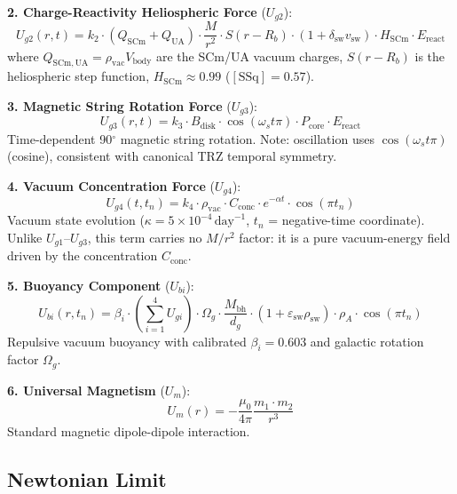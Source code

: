 \documentclass[12pt,a4paper]{article}
\begin{document}
\textbf{2. Charge-Reactivity Heliospheric Force} ($U_{g2}$):
\begin{equation}
U_{g2}(r, t) = k_2 \cdot (Q_{\mathrm{SCm}} + Q_{\mathrm{UA}}) \cdot \frac{M}{r^2} \cdot S(r - R_b) \cdot (1 + \delta_{\mathrm{sw}} v_{\mathrm{sw}}) \cdot H_{\mathrm{SCm}} \cdot E_{\mathrm{react}}
\label{eq:dug2}
\end{equation}
where $Q_{\mathrm{SCm,UA}} = \rho_{\mathrm{vac}} V_{\mathrm{body}}$ are the SCm/UA vacuum charges, $S(r - R_b)$ is the heliospheric step function, $H_{\mathrm{SCm}} \approx 0.99$ ($[\text{SSq}] = 0.57$).

\textbf{3. Magnetic String Rotation Force} ($U_{g3}$):
\begin{equation}
U_{g3}(r, t) = k_3 \cdot B_{\mathrm{disk}} \cdot \cos(\omega_s t \pi) \cdot P_{\mathrm{core}} \cdot E_{\mathrm{react}}
\label{eq:dug3}
\end{equation}
Time-dependent 90$^\circ$ magnetic string rotation. Note: oscillation uses $\cos(\omega_s t \pi)$ (cosine), consistent with canonical TRZ temporal symmetry.

\textbf{4. Vacuum Concentration Force} ($U_{g4}$):
\begin{equation}
U_{g4}(t, t_n) = k_4 \cdot \rho_{\mathrm{vac}} \cdot C_{\mathrm{conc}} \cdot e^{-\alpha t} \cdot \cos(\pi t_n)
\label{eq:dug4}
\end{equation}
Vacuum state evolution ($\kappa = 5 \times 10^{-4}\,\text{day}^{-1}$, $t_n$ = negative-time coordinate). Unlike $U_{g1}$--$U_{g3}$, this term carries no $M/r^2$ factor: it is a pure vacuum-energy field driven by the concentration $C_{\mathrm{conc}}$.

\textbf{5. Buoyancy Component} ($U_{bi}$):
\begin{equation}
U_{bi}(r, t_n) = \beta_i \cdot \left(\sum_{i=1}^{4} U_{gi}\right) \cdot \Omega_g \cdot \frac{M_{\mathrm{bh}}}{d_g} \cdot (1 + \varepsilon_{\mathrm{sw}} \rho_{\mathrm{sw}}) \cdot \rho_A \cdot \cos(\pi t_n)
\label{eq:ubi}
\end{equation}
Repulsive vacuum buoyancy with calibrated $\beta_i = 0.603$ and galactic rotation factor $\Omega_g$.

\textbf{6. Universal Magnetism} ($U_m$):
\begin{equation}
U_m(r) = -\frac{\mu_0}{4\pi} \frac{m_1 \cdot m_2}{r^3}
\label{eq:um}
\end{equation}
Standard magnetic dipole-dipole interaction.

\subsection{Newtonian Limit}
\label{sec:newtonian_limit}
\end{document}
